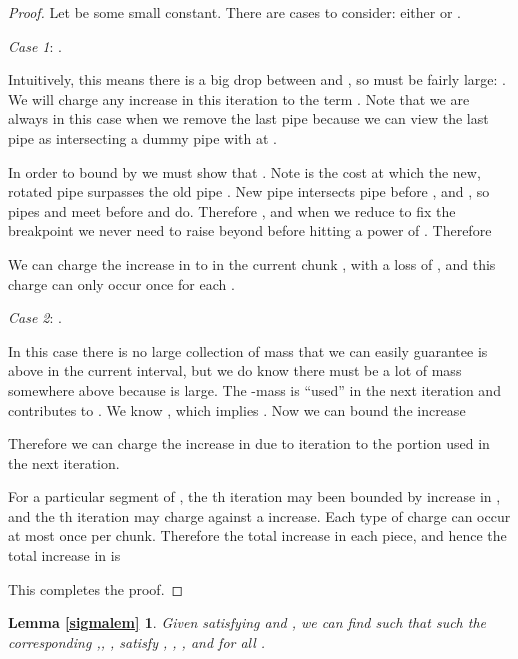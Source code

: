 \documentclass[11pt]{article}
\begin{document}
\begin{proof}
Let  be some small constant.  There are  cases to consider: either  or .  
\begin{description}
\item{\emph{Case 1}}: .

Intuitively, this means there is a big drop between  and , 
so  must be fairly large: .  We will charge any increase in  this iteration to the term .
Note that we are always in this case when we remove the last pipe because we can view the last pipe as intersecting a dummy pipe with  at .

In order to bound  by 
we must show that .
Note  is the cost at which the new, rotated pipe  surpasses the old pipe .  
New pipe  intersects pipe  before , and ,
so pipes  and  meet before  and  do.  
Therefore ,
and when we reduce  to fix the breakpoint we never need to raise  beyond  before hitting a power of .  Therefore


We can charge the increase in  to  in the current chunk , with a loss of , and this charge can only occur once for each .

\item{\emph{Case 2}:} .

In this case there is no large collection of mass that we can easily guarantee is above  in the current interval, but we do know there must be a lot of mass somewhere above  because  is large.  
The -mass  is ``used'' in the next iteration and contributes  to .
We know , which implies .
Now we can bound the increase

Therefore we can charge the increase in  due to iteration  to the portion  used in the next iteration. 
\end{description}

For a particular segment  of , the th iteration may been bounded by  increase in , and the th iteration may charge against a  increase.  Each type of charge can occur at most once per chunk.  Therefore the total increase in each piece, and hence the total increase in  is

This completes the proof.
\end{proof}


\newtheorem*{thm_sigma}{Lemma \ref{sigmalem}}


\begin{thm_sigma} 
Given  satisfying  and ,
we can find  such that such the corresponding ,, ,  satisfy
, , , and  for all .
\end{thm_sigma}
\end{document}
